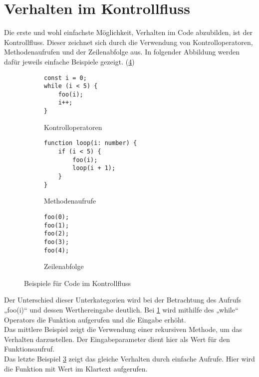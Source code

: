 \section{Verhalten im Kontrollfluss}
Die erste und wohl einfachste Möglichkeit, Verhalten im Code abzubilden, ist der Kontrollfluss. Dieser zeichnet sich durch die Verwendung von Kontrolloperatoren, Methodenaufrufen und der Zeilenabfolge aus. \cite{fiveLines.2023}
In folgender Abbildung werden dafür jeweils einfache Beispiele gezeigt. (\ref{fig:Kontrollfluss})
\begin{figure}[ht]
    \begin{subfigure}[t]{0.30\textwidth}
        \centering
        \begin{minipage}[t]{\linewidth}
            \begin{verbatim}
const i = 0;
while (i < 5) {
    foo(i);
    i++;
}
            \end{verbatim}
        \end{minipage}
        \caption{Kontrolloperatoren}
        \label{fig:Kontrolloperatoren}
    \end{subfigure}
    \hfill
    \begin{subfigure}[t]{0.30\textwidth}
        \centering
        \begin{minipage}[t]{\linewidth}
            \begin{verbatim}
function loop(i: number) {
    if (i < 5) {
        foo(i);
        loop(i + 1);
    }
}
            \end{verbatim}
        \end{minipage}
        \caption{Methodenaufrufe}
        \label{fig:Methodenaufrufe}
    \end{subfigure}
    \hfill
    \begin{subfigure}[t]{0.30\textwidth}
        \centering
        \begin{minipage}[t]{\linewidth}
            \begin{verbatim}
foo(0);
foo(1);
foo(2);
foo(3);
foo(4);
            \end{verbatim}
        \end{minipage}
        \caption{Zeilenabfolge}
        \label{fig:Zeilenabfolge}
    \end{subfigure}
    \caption{Beispiele für Code im Kontrollfluss \cite{fiveLines.2023}}
    \label{fig:Kontrollfluss}
\end{figure}

Der Unterschied dieser Unterkategorien wird bei der Betrachtung des Aufrufs „foo(i)“ und dessen Werthereingabe deutlich. Bei \ref{fig:Kontrolloperatoren} wird mithilfe des „while“ Operators die Funktion aufgerufen und die Eingabe erhöht.\\ Das mittlere Beispiel zeigt die Verwendung einer rekursiven Methode, um das Verhalten darzustellen. Der Eingabeparameter dient hier als Wert für den Funktionsaufruf.\\ Das letzte Beispiel \ref{fig:Zeilenabfolge} zeigt das gleiche Verhalten durch einfache Aufrufe. Hier wird die Funktion mit Wert im Klartext aufgerufen.

